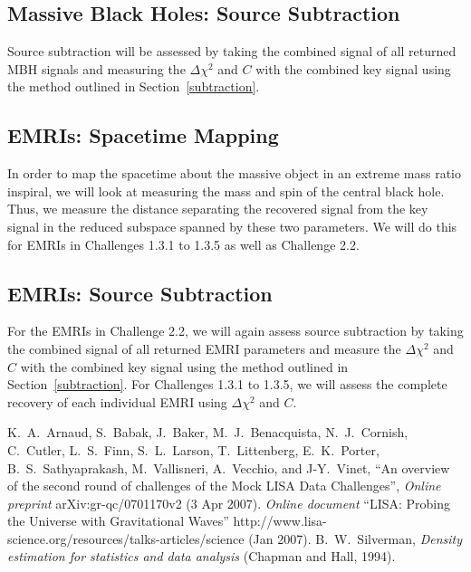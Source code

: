\documentclass[11pt]{article}
\begin{document}
\subsection{Massive Black Holes: Source Subtraction}
Source subtraction will be assessed by taking the combined signal of all returned MBH signals and measuring the $\Delta \chi^2$ and $C$ with the combined key signal using the method outlined in Section~\ref{subtraction}.

\subsection{EMRIs: Spacetime Mapping}
In order to map the spacetime about the massive object in an extreme mass ratio inspiral, we will look at measuring the mass and spin of the central black hole. Thus, we measure the distance separating the recovered signal from the key signal in the reduced subspace spanned by these two parameters. We will do this for EMRIs in Challenges 1.3.1 to 1.3.5 as well as Challenge 2.2.

\subsection{EMRIs: Source Subtraction}
For the EMRIs in Challenge 2.2, we will again assess source subtraction by taking the combined signal of all returned EMRI parameters and measure the $\Delta \chi^2$ and $C$ with the combined key signal using the method outlined in Section~\ref{subtraction}. For Challenges 1.3.1 to 1.3.5, we will assess the complete recovery of each individual EMRI using $\Delta \chi^2$ and $C$.

\begin{thebibliography}{99}
 K.~A.~Arnaud, S.~Babak, J.~Baker, M.~J.~Benacquista, N.~J.~Cornish, C.~Cutler, L.~S.~Finn, S.~L.~Larson, T.~Littenberg, E.~K.~Porter, B.~S.~Sathyaprakash, M.~Vallisneri, A.~Vecchio, and J-Y.~Vinet, ``An overview of the second round of challenges of the Mock LISA Data Challenges'', {\em Online preprint} arXiv:gr-qc/0701170v2 (3 Apr 2007).
 {\em Online document} ``LISA: Probing the Universe
with Gravitational Waves'' http://www.lisa-science.org/resources/talks-articles/science (Jan 2007).
 B.~W.~Silverman, {\em Density estimation for statistics and data analysis} (Chapman and Hall, 1994).
\end{thebibliography}
\end{document}
